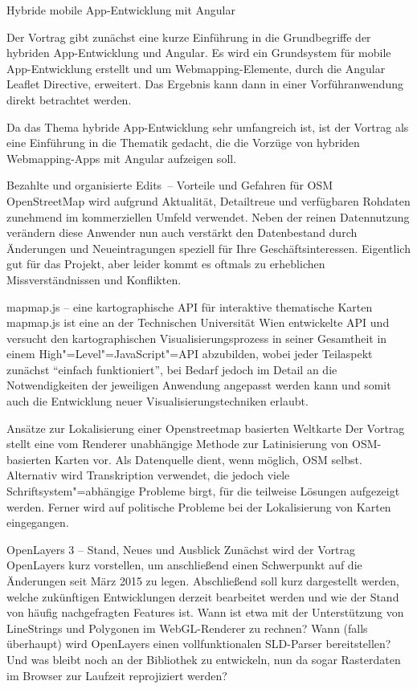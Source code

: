 %
{Hybride mobile App-Entwicklung mit Angular}%
{}%
{Der Vortrag gibt zunächst eine kurze Einführung in die Grundbegriffe
der hybriden App-Entwicklung und Angular. Es wird ein Grundsystem für mobile
App-Entwicklung erstellt und um Webmapping-Elemente, durch die Angular Leaflet Directive,
erweitert. Das Ergebnis kann dann in einer Vorführanwendung direkt betrachtet werden.

Da das Thema hybride App-Entwicklung sehr umfangreich ist, ist der Vortrag als eine
Einführung in die Thematik gedacht, die die Vorzüge von hybriden Webmapping-Apps mit
Angular aufzeigen soll.}

%
{Bezahlte und organisierte Edits~-- Vorteile und Gefahren für OSM}%
{}%
{OpenStreetMap wird aufgrund Aktualität, Detailtreue und verfügbaren Rohdaten
zunehmend im kommerziellen Umfeld verwendet. Neben der reinen
Datennutzung verändern diese Anwender nun auch verstärkt den
Datenbestand durch Änderungen und Neueintragungen speziell für Ihre
Geschäftsinteressen. Eigentlich gut für das Projekt, aber leider kommt
es oftmals zu erheblichen Missverständnissen und Konflikten.}

%
{mapmap.js -- eine kartographische API für interaktive thematische Karten}%
{}%
{mapmap.js ist eine an der Technischen Universität Wien entwickelte API und
versucht den kartographischen
Visualisierungsprozess in seiner Gesamtheit in einem High"=Level"=Java\-Script"=API
abzubilden, wobei jeder Teilaspekt zunächst "`einfach funktioniert"', bei
Bedarf jedoch im Detail an die Notwendigkeiten der jeweiligen Anwendung angepasst werden
kann und somit auch die Entwicklung neuer Visualisierungstechniken erlaubt.}

%
{Ansätze zur Lokalisierung einer Openstreetmap basierten \mbox{Weltkarte}}%
{}%
{Der Vortrag stellt eine vom Renderer unabhängige Methode zur Latinisierung
von OSM-basierten Karten vor. Als Datenquelle dient, wenn möglich, OSM
selbst. Alternativ wird Transkription verwendet, die jedoch viele
Schriftsystem"=abhängige Probleme birgt, für die teilweise Lösungen
aufgezeigt werden. Ferner wird auf politische Probleme bei der Lokalisierung
von Karten eingegangen.}

%
{OpenLayers 3 -- Stand, Neues und Ausblick}%
{}%
{Zunächst wird der Vortrag OpenLayers kurz vorstellen, um anschließend einen Schwerpunkt auf
die Änderungen seit März 2015 zu legen. Abschließend soll kurz dargestellt werden,
welche zukünftigen Entwicklungen derzeit bearbeitet werden und wie der Stand von
häufig nachgefragten Features ist. Wann ist etwa mit der Unterstützung von
LineStrings und Polygonen im WebGL-Renderer zu rechnen? Wann (falls überhaupt)
wird OpenLayers einen vollfunktionalen SLD-Parser bereitstellen? Und was bleibt
noch an der Bibliothek zu entwickeln, nun da sogar Raster\-daten im Browser zur
Laufzeit reprojiziert werden?}


